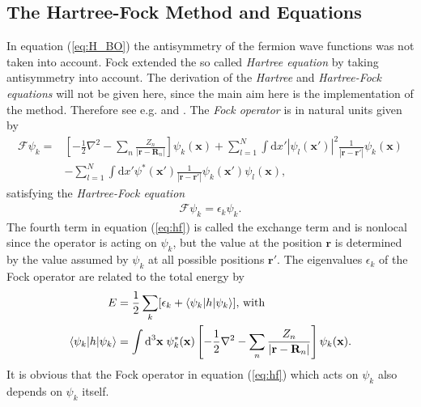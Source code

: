 \documentclass[twoside,        %
			   12pt,			%
               BCOR10mm,       %
               ngerman,english  %
               ]{scrartcl}
\begin{document}
\subsection{The Hartree-Fock Method and Equations}
In equation (\ref{eq:H_BO}) the antisymmetry of the fermion wave functions was not taken into account. Fock extended the so called \textit{Hartree equation} by taking antisymmetry into account. The derivation of the \textit{Hartree} and \textit{Hartree-Fock equations} will not be given here, since the main aim here is the implementation of the method. Therefore see e.g. \cite[p. 56-60]{Thijssen2007} and \cite[chapter 3]{Jensen2013}. The \textit{Fock operator} is in natural units given by
 \begin{align} \label{eq:hf}
 \mathcal{F}\psi_k = &\left[-\frac{1}{2} \nabla^2 
 - \sum_n \frac{Z_n}{|\mathbf{r}- \mathbf{R}_n|}\right]\psi_k(\mathbf{x}) + \nonumber
 \sum_{l=1}^N \int \text{d}x' |\psi_l(\mathbf{x}')|^2 \frac{1}{|\mathbf{r}-\mathbf{r}'|} \psi_k(\mathbf{x}) \\
&- \sum_{l=1}^N \int \text{d}x' \psi^*(\mathbf{x}')\frac{1}{|\mathbf{r}-\mathbf{r}'|} \psi_k(\mathbf{x}')\psi_l(\mathbf{x})\text{,}
\end{align}
 satisfying the \textit{Hartree-Fock equation}
\begin{align*}
\mathcal{F} \psi_k = \epsilon_k \psi_k \text{.}
\end{align*} The fourth term in equation (\ref{eq:hf}) is called the exchange term \cite[p. 55]{Thijssen2007} and is nonlocal since the operator is acting on $\psi_k$, but the value at the position $\mathbf{r}$ is determined by the value assumed by $\psi_k$ at all possible positions $\mathbf{r}'$. The eigenvalues $\epsilon_k$ of the Fock operator are related to the total energy by
 \begin{align*}
 E &= \frac{1}{2} \sum_k [\epsilon_k + \braket{\psi_k|h|\psi_k}] \text{, with}\\
 \braket{\psi_k|h|\psi_k} &= \int \text{d}^3\mathbf{x}\; \psi_k^*(\mathbf{x}) \left[-\frac{1}{2} \nabla^2 
 - \sum_n \frac{Z_n}{|\mathbf{r}- \mathbf{R}_n|}\right] \psi_k(\mathbf{x}) \text{.}
 \end{align*} It is obvious that the Fock operator in equation (\ref{eq:hf}) which acts on $\psi_k$ also depends on $\psi_k$ itself.
    
    
    
    
\end{document}
